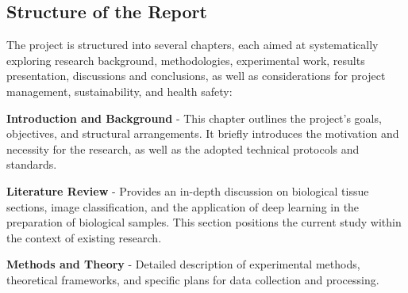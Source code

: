 \subsection{Structure of the Report}










The project is structured into several chapters, each aimed at systematically exploring research background, methodologies, experimental work, results presentation, discussions and conclusions, as well as considerations for project management, sustainability, and health safety:

\textbf{Introduction and Background} - This chapter outlines the project's goals, objectives, and structural arrangements. It briefly introduces the motivation and necessity for the research, as well as the adopted technical protocols and standards.

\textbf{Literature Review} - Provides an in-depth discussion on biological tissue sections, image classification, and the application of deep learning in the preparation of biological samples. This section positions the current study within the context of existing research.

\textbf{Methods and Theory} - Detailed description of experimental methods, theoretical frameworks, and specific plans for data collection and processing.


